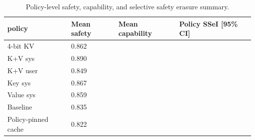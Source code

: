 \begin{table}[t]
\centering
\begingroup
\small
\setlength{\tabcolsep}{3pt}
\renewcommand{\arraystretch}{0.94}
\begin{tabularx}{\linewidth}{@{}lXXX@{}}
\toprule
policy & Mean safety & Mean capability & Policy SSeI [95\% CI] \\
\midrule
4-bit KV & 0.862 &  &  \\
K+V sys & 0.890 &  &  \\
K+V user & 0.849 &  &  \\
Key sys & 0.867 &  &  \\
Value sys & 0.859 &  &  \\
Baseline & 0.835 &  &  \\
Policy-pinned cache & 0.822 &  &  \\
\bottomrule
\end{tabularx}
\endgroup
\caption{Policy-level safety, capability, and selective safety erasure summary.}
\label{tab:main-results}
\end{table}

